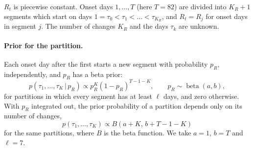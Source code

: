 \documentclass[11pt,a4paper]{article}
\newcommand{\given}{\,|\,}
\begin{document}
$R_t$ is piecewise constant. Onset days $1,\dots,T$ (here $T=82$) are divided
into $K_R+1$ segments which start on days $1=\tau_0<\tau_1<\dots<\tau_{K_R}$,
and $R_t=R_j$ for onset days in segment $j$. The number of changes $K_R$ and
the days $\tau_k$ are unknown.

\paragraph{Prior for the partition.} Each onset day after the first starts a
new segment with probability $p_R$, independently, and $p_R$ has a beta
prior:
\begin{equation}\label{eq:partitionprior}
p(\tau_1,\dots,\tau_{K}\given p_R) \propto p_R^{K}(1-p_R)^{T-1-K},
\qquad p_R\sim\operatorname{beta}(a,b),
\end{equation}
for partitions in which every segment has at least $\ell$ days, and zero
otherwise.
With $p_R$ integrated out, the prior probability of a partition depends only
on its number of changes,
\begin{equation}\label{eq:partitionmarginal}
p(\tau_1,\dots,\tau_K) \propto B(a+K,\,b+T-1-K)
\end{equation}
for the same partitions, where $B$ is the beta function. We take $a=1$, $b=T$ and $\ell=7$.
\end{document}

